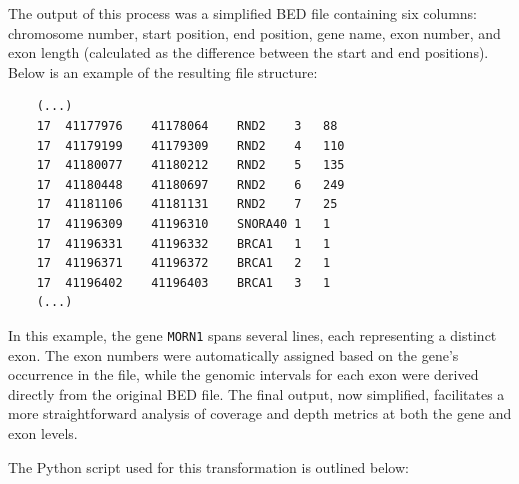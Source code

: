 The output of this process was a simplified BED file containing six columns: chromosome number, start position, end position, gene name, exon number, and exon length (calculated as the difference between the start and end positions). Below is an example of the resulting file structure:

\begin{verbatim}
    (...)
    17	41177976	41178064	RND2	3	88
    17	41179199	41179309	RND2	4	110
    17	41180077	41180212	RND2	5	135
    17	41180448	41180697	RND2	6	249
    17	41181106	41181131	RND2	7	25
    17	41196309	41196310	SNORA40	1	1
    17	41196331	41196332	BRCA1	1	1
    17	41196371	41196372	BRCA1	2	1
    17	41196402	41196403	BRCA1	3	1
    (...)
\end{verbatim}

In this example, the gene \texttt{MORN1} spans several lines, each representing a distinct exon. The exon numbers were automatically assigned based on the gene's occurrence in the file, while the genomic intervals for each exon were derived directly from the original BED file. The final output, now simplified, facilitates a more straightforward analysis of coverage and depth metrics at both the gene and exon levels.

The Python script used for this transformation is outlined below:

